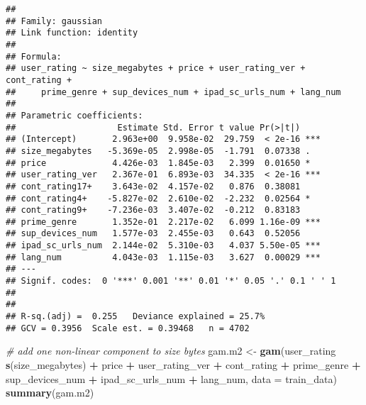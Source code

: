 \documentclass[]{article}
\newenvironment{Shaded}{\begin{snugshade}}{\end{snugshade}}
\newcommand{\KeywordTok}[1]{\textcolor[rgb]{0.13,0.29,0.53}{\textbf{#1}}}
\newcommand{\DataTypeTok}[1]{\textcolor[rgb]{0.13,0.29,0.53}{#1}}
\newcommand{\StringTok}[1]{\textcolor[rgb]{0.31,0.60,0.02}{#1}}
\newcommand{\CommentTok}[1]{\textcolor[rgb]{0.56,0.35,0.01}{\textit{#1}}}
\newcommand{\OperatorTok}[1]{\textcolor[rgb]{0.81,0.36,0.00}{\textbf{#1}}}
\newcommand{\NormalTok}[1]{#1}
\begin{document}
\begin{verbatim}
## 
## Family: gaussian 
## Link function: identity 
## 
## Formula:
## user_rating ~ size_megabytes + price + user_rating_ver + cont_rating + 
##     prime_genre + sup_devices_num + ipad_sc_urls_num + lang_num
## 
## Parametric coefficients:
##                    Estimate Std. Error t value Pr(>|t|)    
## (Intercept)       2.963e+00  9.958e-02  29.759  < 2e-16 ***
## size_megabytes   -5.369e-05  2.998e-05  -1.791  0.07338 .  
## price             4.426e-03  1.845e-03   2.399  0.01650 *  
## user_rating_ver   2.367e-01  6.893e-03  34.335  < 2e-16 ***
## cont_rating17+    3.643e-02  4.157e-02   0.876  0.38081    
## cont_rating4+    -5.827e-02  2.610e-02  -2.232  0.02564 *  
## cont_rating9+    -7.236e-03  3.407e-02  -0.212  0.83183    
## prime_genre       1.352e-01  2.217e-02   6.099 1.16e-09 ***
## sup_devices_num   1.577e-03  2.455e-03   0.643  0.52056    
## ipad_sc_urls_num  2.144e-02  5.310e-03   4.037 5.50e-05 ***
## lang_num          4.043e-03  1.115e-03   3.627  0.00029 ***
## ---
## Signif. codes:  0 '***' 0.001 '**' 0.01 '*' 0.05 '.' 0.1 ' ' 1
## 
## 
## R-sq.(adj) =  0.255   Deviance explained = 25.7%
## GCV = 0.3956  Scale est. = 0.39468   n = 4702
\end{verbatim}

\begin{Shaded}
\begin{Highlighting}[]
\CommentTok{# add one non-linear component to size bytes}
\NormalTok{gam.m2 <-}\StringTok{ }\KeywordTok{gam}\NormalTok{(user_rating }\OperatorTok{~}\StringTok{ }\KeywordTok{s}\NormalTok{(size_megabytes) }\OperatorTok{+}\StringTok{ }\NormalTok{price }\OperatorTok{+}
\StringTok{                }\NormalTok{user_rating_ver }\OperatorTok{+}\StringTok{ }\NormalTok{cont_rating }\OperatorTok{+}\StringTok{ }\NormalTok{prime_genre }\OperatorTok{+}\StringTok{ }\NormalTok{sup_devices_num }\OperatorTok{+}
\StringTok{                }\NormalTok{ipad_sc_urls_num }\OperatorTok{+}\StringTok{ }\NormalTok{lang_num, }\DataTypeTok{data =}\NormalTok{ train_data)}
\KeywordTok{summary}\NormalTok{(gam.m2) }
\end{Highlighting}
\end{Shaded}
\end{document}

